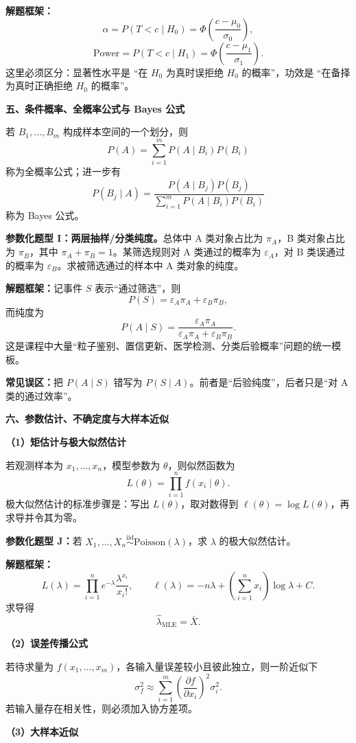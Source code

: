 \textbf{解题框架：}
\[
\alpha=P(T<c\mid H_0)=\Phi\!\left(\frac{c-\mu_0}{\sigma_0}\right),
\]
\[
\text{Power}=P(T<c\mid H_1)=\Phi\!\left(\frac{c-\mu_1}{\sigma_1}\right).
\]
这里必须区分：显著性水平是 ``在 $H_0$ 为真时误拒绝 $H_0$ 的概率''，功效是 ``在备择为真时正确拒绝 $H_0$ 的概率''。

\textbf{五、条件概率、全概率公式与 Bayes 公式}

若 $B_1,\dots,B_m$ 构成样本空间的一个划分，则
\[
P(A)=\sum_{i=1}^m P(A\mid B_i)P(B_i)
\]
称为全概率公式；进一步有
\[
P(B_j\mid A)=\frac{P(A\mid B_j)P(B_j)}{\sum_{i=1}^m P(A\mid B_i)P(B_i)}
\]
称为 Bayes 公式。

\textbf{参数化题型 I：两层抽样/分类纯度。}总体中 A 类对象占比为 $\pi_A$，B 类对象占比为 $\pi_B$，其中 $\pi_A+\pi_B=1$。某筛选规则对 A 类通过的概率为 $\varepsilon_A$，对 B 类误通过的概率为 $\varepsilon_B$。求被筛选通过的样本中 A 类对象的纯度。

\textbf{解题框架：}记事件 $S$ 表示“通过筛选”，则
\[
P(S)=\varepsilon_A\pi_A+\varepsilon_B\pi_B,
\]
而纯度为
\[
P(A\mid S)=\frac{\varepsilon_A\pi_A}{\varepsilon_A\pi_A+\varepsilon_B\pi_B}.
\]
这是课程中大量“粒子鉴别、置信更新、医学检测、分类后验概率”问题的统一模板。

\textbf{常见误区：}把 $P(A\mid S)$ 错写为 $P(S\mid A)$。前者是“后验纯度”，后者只是“对 A 类的通过效率”。

\textbf{六、参数估计、不确定度与大样本近似}

\textbf{（1）矩估计与极大似然估计}

若观测样本为 $x_1,\dots,x_n$，模型参数为 $\theta$，则似然函数为
\[
L(\theta)=\prod_{i=1}^n f(x_i\mid \theta).
\]
极大似然估计的标准步骤是：写出 $L(\theta)$，取对数得到 $\ell(\theta)=\log L(\theta)$，再求导并令其为零。

\textbf{参数化题型 J：}若 $X_1,\dots,X_n\overset{\mathrm{iid}}{\sim}\mathrm{Poisson}(\lambda)$，求 $\lambda$ 的极大似然估计。

\textbf{解题框架：}
\[
L(\lambda)=\prod_{i=1}^n e^{-\lambda}\frac{\lambda^{x_i}}{x_i!},\qquad
\ell(\lambda)=-n\lambda+\left(\sum_{i=1}^n x_i\right)\log\lambda + C.
\]
求导得
\[
\hat\lambda_{\mathrm{MLE}}=\bar X.
\]

\textbf{（2）误差传播公式}

若待求量为 $f(x_1,\dots,x_m)$，各输入量误差较小且彼此独立，则一阶近似下
\[
\sigma_f^2\approx \sum_{i=1}^m\left(\frac{\partial f}{\partial x_i}\right)^2\sigma_i^2.
\]
若输入量存在相关性，则必须加入协方差项。

\textbf{（3）大样本近似}

